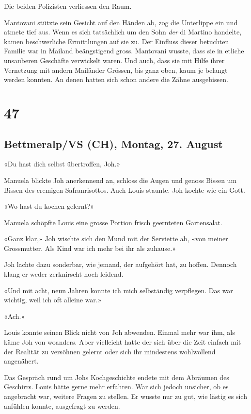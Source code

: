 Die beiden Polizisten verliessen den Raum.

Mantovani stützte sein Gesicht auf den Händen ab, zog die Unterlippe ein
und atmete tief aus. Wenn es sich tatsächlich um den Sohn \emph{der} di
Martino handelte, kamen beschwerliche Ermittlungen auf sie zu. Der
Einfluss dieser betuchten Familie war in Mailand beängstigend gross.
Mantovani wusste, dass sie in etliche unsauberen Geschäfte verwickelt
waren. Und auch, dass sie mit Hilfe ihrer Vernetzung mit andern
Mailänder Grössen, bis ganz oben, kaum je belangt werden konnten. An
denen hatten sich schon andere die Zähne ausgebissen.

\chapter{47}\label{section-47}

\section{Bettmeralp/VS (CH), Montag, 27.
August}\label{bettmeralpvs-ch-montag-27.-august}

«Du hast dich selbst übertroffen, Joh.»

Manuela blickte Joh anerkennend an, schloss die Augen und genoss Bissen
um Bissen des cremigen Safranrisottos. Auch Louis staunte. Joh kochte
wie ein Gott.

«Wo hast du kochen gelernt?»

Manuela schöpfte Louis eine grosse Portion frisch geernteten
Gartensalat.

«Ganz klar,» Joh wischte sich den Mund mit der Serviette ab, «von meiner
Grossmutter. Als Kind war ich mehr bei ihr als zuhause.»

Joh lachte dazu sonderbar, wie jemand, der aufgehört hat, zu hoffen.
Dennoch klang er weder zerknirscht noch leidend.

«Und mit acht, neun Jahren konnte ich mich selbständig verpflegen. Das
war wichtig, weil ich oft alleine war.»

«Ach.»

Louis konnte seinen Blick nicht von Joh abwenden. Einmal mehr war ihm,
als käme Joh von woanders. Aber vielleicht hatte der sich über die Zeit
einfach mit der Realität zu versöhnen gelernt oder sich ihr mindestens
wohlwollend angenähert.

Das Gespräch rund um Johs Kochgeschichte endete mit dem Abräumen des
Geschirrs. Louis hätte gerne mehr erfahren. War sich jedoch unsicher, ob
es angebracht war, weitere Fragen zu stellen. Er wusste nur zu gut, wie
lästig es sich anfühlen konnte, ausgefragt zu werden.

